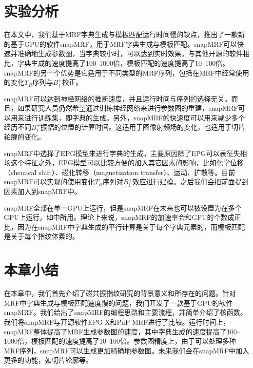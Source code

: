 \section{实验分析}
在本文中，我们基于MRF字典生成与模板匹配运行时间慢的缺点，推出了一款新的基于GPU的软件snapMRF，用于MRF字典生成与模板匹配。snapMRF可以快速并准确地生成参数图，当字典较小时，可以达到实时效果。与其他开源的软件相比，字典生成的速度提高了100--1000倍，模板匹配的速度提高了10--100倍。snapMRF的另一个优势是它适用于不同类型的MRF序列，包括在MRF中经常使用的变化$T_R$序列与$B_1^+$校正。

snapMRF可以达到神经网络的推断速度，并且运行时间与序列的选择无关。而且，如果研究人员仍然希望通过训练神经网络来进行参数图的重建，snapMRF可以用来进行训练集，即字典的生成。另外，snapMRF的快速度可以用来减少多个经历不同$B_1^+$振幅的位置的计算时间。这适用于图像射频场的变化，也适用于切片轮廓\cite{Ma_B1_MRF}的变化。

snapMRF中选择了EPG模型来进行字典的生成，主要原因除了EPG可以表征失相场这个特征之外，EPG模型可以比较方便的加入其它因素的影响，比如化学位移（chemical shift）、磁化转移（magnetization transfer）\cite{Hamilton}、运动、扩散等。目前snapMRF可以实现的使用变化$T_R$序列对$B_1^+$效应进行建模。之后我们会把前面提到因素加入到snapMRF中。

snapMRF全部在单一GPU上运行，但是snapMRF在未来也可以被设置为在多个GPU上运行，如\cite{tron}中所用。理论上来说，snapMRF的加速率会和GPU的个数成正比，因为在snapMRF中字典生成的平行计算是关于每个字典元素的，而模板匹配是关于每个指纹体素的。

\section{本章小结}
在本章中，我们首先介绍了磁共振指纹研究的背景意义和所存在的问题。针对MRF中字典生成与模板匹配速度慢的问题，我们开发了一款基于GPU的软件snapMRF。我们给出了snapMRF的编程思路和主要流程，并简单介绍了核函数。我们将snapMRF与开源软件EPG-X和PnP-MRF进行了比较。运行时间上，snapMRF整体提高了MRF生成参数图的速度，其中字典生成的速度提高了100--1000倍，模板匹配的速度提高了10--100倍。参数图精度上，由于可以处理多种MRF序列，snapMRF可以生成更加精确地参数图。未来我们会在snapMRF中加入更多的功能，如切片轮廓等。





















